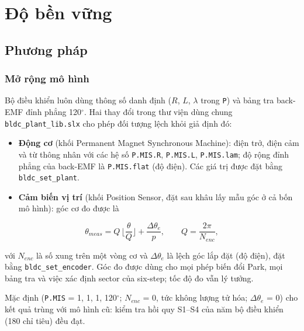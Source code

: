 \section{Độ bền vững}\label{sec:10}



\subsection{Phương pháp}\label{sec:10.1}

\subsubsection{Mở rộng mô hình}\label{sec:10.1.1}

Bộ điều khiển luôn dùng thông số danh định ($R$, $L$, $\lambda$ trong \texttt{P}) và bảng tra back-EMF đỉnh phẳng 120$^\circ$. Hai thay đổi trong thư viện dùng chung \texttt{bldc\_plant\_lib.slx} cho phép đối tượng lệch khỏi giả định đó:

\begin{itemize}[leftmargin=*]
\item \textbf{Động cơ} (khối Permanent Magnet Synchronous Machine): điện trở, điện cảm và từ thông nhân với các hệ số \texttt{P.MIS.R}, \texttt{P.MIS.L}, \texttt{P.MIS.lam}; độ rộng đỉnh phẳng của back-EMF là \texttt{P.MIS.flat} (độ điện). Các giá trị được đặt bằng \texttt{bldc\_set\_plant}.
\item \textbf{Cảm biến vị trí} (khối Position Sensor, đặt sau khâu lấy mẫu góc ở cả bốn mô hình): góc cơ đo được là
\end{itemize}

\begin{equation}
\theta_{meas} = Q\,\Big\lfloor \frac{\theta}{Q} \Big\rfloor + \frac{\Delta\theta_e}{p}, \qquad Q = \frac{2\pi}{N_{enc}},
\tag{10.1}\label{eq:10.1}
\end{equation}

với $N_{enc}$ là số xung trên một vòng cơ và $\Delta\theta_e$ là lệch góc lắp đặt (độ điện), đặt bằng \texttt{bldc\_set\_encoder}. Góc đo được dùng cho mọi phép biến đổi Park, mọi bảng tra và việc xác định sector của six-step; tốc độ đo vẫn lý tưởng.

Mặc định (\texttt{P.MIS} = 1, 1, 1, 120$^\circ$; $N_{enc}$ = 0, tức không lượng tử hóa; $\Delta\theta_e$ = 0) cho kết quả trùng với mô hình cũ: kiểm tra hồi quy S1–S4 của năm bộ điều khiển (180 chỉ tiêu) đều đạt.

